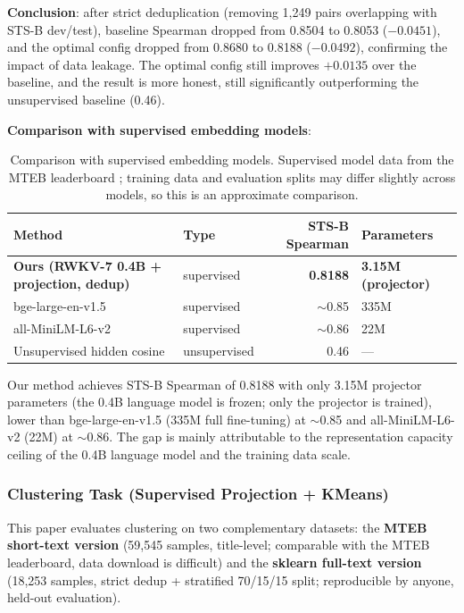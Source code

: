 \documentclass[11pt]{article}
\begin{document}
\textbf{Conclusion}: after strict deduplication (removing 1,249 pairs
overlapping with STS-B dev/test), baseline Spearman dropped from 0.8504 to
0.8053 ($-0.0451$), and the optimal config dropped from 0.8680 to 0.8188
($-0.0492$), confirming the impact of data leakage. The optimal config still
improves $+0.0135$ over the baseline, and the result is more honest, still
significantly outperforming the unsupervised baseline (0.46).

\textbf{Comparison with supervised embedding models}:

\begin{table}[h]
\centering
\begin{tabular}{llrl}
\toprule
Method & Type & STS-B Spearman & Parameters \\
\midrule
\textbf{Ours (RWKV-7 0.4B + projection, dedup)} & supervised &
\textbf{0.8188} & \textbf{3.15M (projector)} \\
bge-large-en-v1.5 \cite{bge} & supervised & $\sim$0.85 & 335M \\
all-MiniLM-L6-v2 \cite{minilm} & supervised & $\sim$0.86 & 22M \\
Unsupervised hidden cosine & unsupervised & 0.46 & --- \\
\bottomrule
\end{tabular}
\caption{Comparison with supervised embedding models. Supervised model data
from the MTEB leaderboard \cite{mteb}; training data and evaluation splits
may differ slightly across models, so this is an approximate comparison.}
\end{table}

Our method achieves STS-B Spearman of 0.8188 with only 3.15M projector
parameters (the 0.4B language model is frozen; only the projector is
trained), lower than bge-large-en-v1.5 (335M full fine-tuning) at
$\sim$0.85 and all-MiniLM-L6-v2 (22M) at $\sim$0.86. The gap is mainly
attributable to the representation capacity ceiling of the 0.4B language
model and the training data scale.

\subsubsection{Clustering Task (Supervised Projection + KMeans)}

This paper evaluates clustering on two complementary datasets: the
\textbf{MTEB short-text version} (59,545 samples, title-level; comparable
with the MTEB leaderboard, data download is difficult) and the
\textbf{sklearn full-text version} (18,253 samples, strict dedup +
stratified 70/15/15 split; reproducible by anyone, held-out evaluation).
\end{document}
